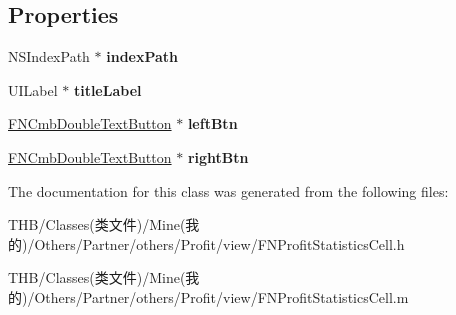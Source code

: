 \subsection*{Properties}
\begin{DoxyCompactItemize}
\item 
\mbox{\label{interface_f_n_profit_statistics_cell_a6dd51d0215962112685f358025b722a1}} 
N\+S\+Index\+Path $\ast$ {\bfseries index\+Path}
\item 
\mbox{\label{interface_f_n_profit_statistics_cell_afd962b0e69b115860741c8f4ea90dfcb}} 
U\+I\+Label $\ast$ {\bfseries title\+Label}
\item 
\mbox{\label{interface_f_n_profit_statistics_cell_a3a5d9282292b8e84fc8f7d7d1df28d78}} 
\mbox{\hyperlink{interface_f_n_cmb_double_text_button}{F\+N\+Cmb\+Double\+Text\+Button}} $\ast$ {\bfseries left\+Btn}
\item 
\mbox{\label{interface_f_n_profit_statistics_cell_a0bedc6256e61656a81b4d9c18ee36d14}} 
\mbox{\hyperlink{interface_f_n_cmb_double_text_button}{F\+N\+Cmb\+Double\+Text\+Button}} $\ast$ {\bfseries right\+Btn}
\end{DoxyCompactItemize}


The documentation for this class was generated from the following files\+:\begin{DoxyCompactItemize}
\item 
T\+H\+B/\+Classes(类文件)/\+Mine(我的)/\+Others/\+Partner/others/\+Profit/view/F\+N\+Profit\+Statistics\+Cell.\+h\item 
T\+H\+B/\+Classes(类文件)/\+Mine(我的)/\+Others/\+Partner/others/\+Profit/view/F\+N\+Profit\+Statistics\+Cell.\+m\end{DoxyCompactItemize}
